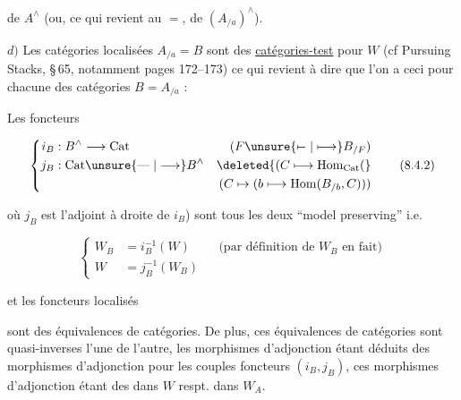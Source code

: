 
de $A^\wedge$ (ou, ce qui revient au $=$,  de $(A_{/a})^\wedge$).


$d)$ Les catégories localisées $A_{/a}=B$ sont des
\uline{catégories-test} pour $W$ (cf Pursuing Stacks, \S\,65, notamment pages 172--173)
ce qui revient à dire que l'on a ceci pour chacune des  catégories $B=A_{/a}$ :


 Les foncteurs

\[
 \left\{\begin{aligned}
 i_B &: B^\wedge\longrightarrow\mathrm{Cat}
 & (F\unsure{\mapstochar\relbar|\longmapsto} B_{/F})\\
 j_B &: \mathrm{Cat}\unsure{\mathrel{\text{---}}|\longrightarrow} B^\wedge
 &\deleted{(C\longmapsto\mathrm{Hom}_{\mathrm{Cat}}(}\\
 &&(C\mapsto(b\longmapsto\mathrm{Hom}(B_{/b},C)))
 \end{aligned}\right.
 \tag*{(8.4.2)}
\]

 où $j_B$ est l'adjoint à droite de $i_B$) sont tous les deux ``model preserving'' i.e.

\[
 \left\{\begin{aligned}
 W_B&=i_B^{-1}(W) &&\text{(par définition de }W_B\text{ en fait)}\\
 W&=j_B^{-1}(W_B)
 \end{aligned}\right.
 \tag*{(8.4.3.)}
\]

et les foncteurs  localisés


sont des équivalences de catégories. De plus, ces équivalences de catégories sont
quasi-inverses l'une de l'autre, les morphismes d'adjonction étant déduits
des morphismes d'adjonction pour les couples foncteurs  $(i_B,j_B)$, ces morphismes d'adjonction
étant des  dans $W$ respt. dans $W_A$.
